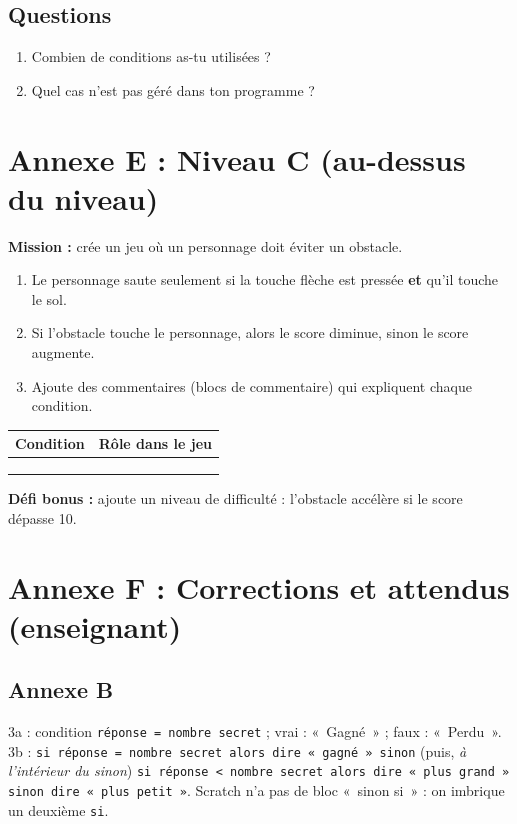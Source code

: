 \documentclass[11pt,a4paper]{article}
\begin{document}
\subsection*{Questions}
\begin{enumerate}
 \item Combien de conditions as-tu utilisées ? \dotfill
 \item Quel cas n'est pas géré dans ton programme ? \dotfill
\end{enumerate}

\newpage
\section*{Annexe E : Niveau C (au-dessus du niveau)}

\textbf{Mission :} crée un jeu où un personnage doit éviter un obstacle.

\begin{enumerate}
 \item Le personnage saute seulement si la touche flèche est pressée \textbf{et} qu'il touche le sol.
 \item Si l'obstacle touche le personnage, alors le score diminue, sinon le score augmente.
 \item Ajoute des commentaires (blocs de commentaire) qui expliquent chaque condition.
\end{enumerate}

\begin{tabularx}{\linewidth}{>{\bfseries}p{4cm}Y}
\toprule
Condition & Rôle dans le jeu\\
\midrule
 & \\ & \\ & \\
\bottomrule
\end{tabularx}

\textbf{Défi bonus :} ajoute un niveau de difficulté : l'obstacle accélère si le score dépasse 10.

\newpage
\section*{Annexe F : Corrections et attendus (enseignant)}

\subsection*{Annexe B}
3a : condition \texttt{réponse = nombre secret} ; vrai : «~Gagné~» ; faux : «~Perdu~». 3b : \texttt{si réponse = nombre secret alors dire «~gagné~» sinon} (puis, \emph{à l'intérieur du sinon}) \texttt{si réponse < nombre secret alors dire «~plus grand~» sinon dire «~plus petit~»}. Scratch n'a pas de bloc «~sinon si~» : on imbrique un deuxième \texttt{si}.
\end{document}

